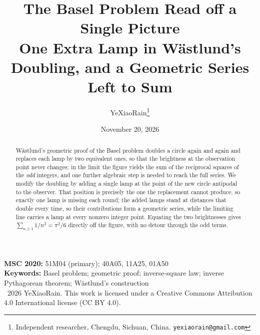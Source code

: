 \documentclass[11pt,a4paper]{article}
\title{\textbf{The Basel Problem Read off a Single Picture}\\[0.3em]
\large One Extra Lamp in W\"astlund's Doubling, and a Geometric Series Left to Sum}
\author{YeXiaoRain\thanks{Independent researcher, Chengdu, Sichuan, China.
  \texttt{yexiaorain@gmail.com}}}
\date{November 20, 2026}
\theoremstyle{definition}
\begin{document}
\maketitle

\begin{abstract}
W\"astlund's geometric proof of the Basel problem doubles a circle again and again and
replaces each lamp by two equivalent ones, so that the brightness at the observation point
never changes; in the limit the figure yields the sum of the reciprocal squares of the
\emph{odd} integers, and one further algebraic step is needed to reach the full series.
We modify the doubling by adding a single lamp at the point of the new circle antipodal to
the observer. That position is precisely the one the replacement cannot produce, so exactly
one lamp is missing each round; the added lamps stand at distances that double every time,
so their contributions form a geometric series, while the limiting line carries a lamp at
every nonzero integer point. Equating the two brightnesses gives $\sum_{n\ge1}1/n^{2}=\pi^{2}/6$
directly off the figure, with no detour through the odd terms.
\end{abstract}

\begin{center}
\small
\textbf{MSC 2020:} 51M04 (primary); 40A05, 11A25, 01A50\\[0.3em]
\textbf{Keywords:} Basel problem; geometric proof; inverse-square law;
inverse Pythagorean theorem; W\"astlund's construction\\[0.5em]
\textcopyright\ 2026 YeXiaoRain. This work is licensed under a Creative Commons
Attribution 4.0 International license (CC BY 4.0).
\end{center}





\end{document}
